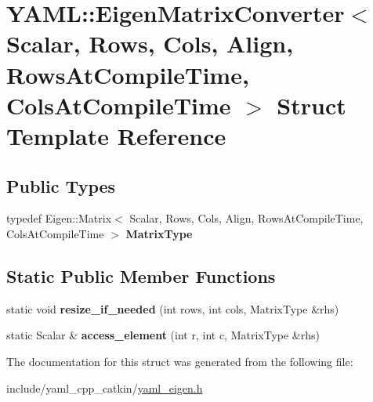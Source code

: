 \hypertarget{structYAML_1_1EigenMatrixConverter}{}\section{Y\+A\+ML\+:\+:Eigen\+Matrix\+Converter$<$ Scalar, Rows, Cols, Align, Rows\+At\+Compile\+Time, Cols\+At\+Compile\+Time $>$ Struct Template Reference}
\label{structYAML_1_1EigenMatrixConverter}
\subsection*{Public Types}
\begin{DoxyCompactItemize}
\item 
typedef Eigen\+::\+Matrix$<$ Scalar, Rows, Cols, Align, Rows\+At\+Compile\+Time, Cols\+At\+Compile\+Time $>$ {\bfseries Matrix\+Type}\hypertarget{structYAML_1_1EigenMatrixConverter_a46c2e1524d0287ef8e0bbfad07f4111a}{}\label{structYAML_1_1EigenMatrixConverter_a46c2e1524d0287ef8e0bbfad07f4111a}

\end{DoxyCompactItemize}
\subsection*{Static Public Member Functions}
\begin{DoxyCompactItemize}
\item 
static void {\bfseries resize\+\_\+if\+\_\+needed} (int rows, int cols, Matrix\+Type \&rhs)\hypertarget{structYAML_1_1EigenMatrixConverter_a61d62ab23d2ff9fe961f052e18da4998}{}\label{structYAML_1_1EigenMatrixConverter_a61d62ab23d2ff9fe961f052e18da4998}

\item 
static Scalar \& {\bfseries access\+\_\+element} (int r, int c, Matrix\+Type \&rhs)\hypertarget{structYAML_1_1EigenMatrixConverter_ad9f58bba84fc000b6aecd10142ecc16e}{}\label{structYAML_1_1EigenMatrixConverter_ad9f58bba84fc000b6aecd10142ecc16e}

\end{DoxyCompactItemize}


The documentation for this struct was generated from the following file\+:\begin{DoxyCompactItemize}
\item 
include/yaml\+\_\+cpp\+\_\+catkin/\hyperlink{yaml__eigen_8h}{yaml\+\_\+eigen.\+h}\end{DoxyCompactItemize}
